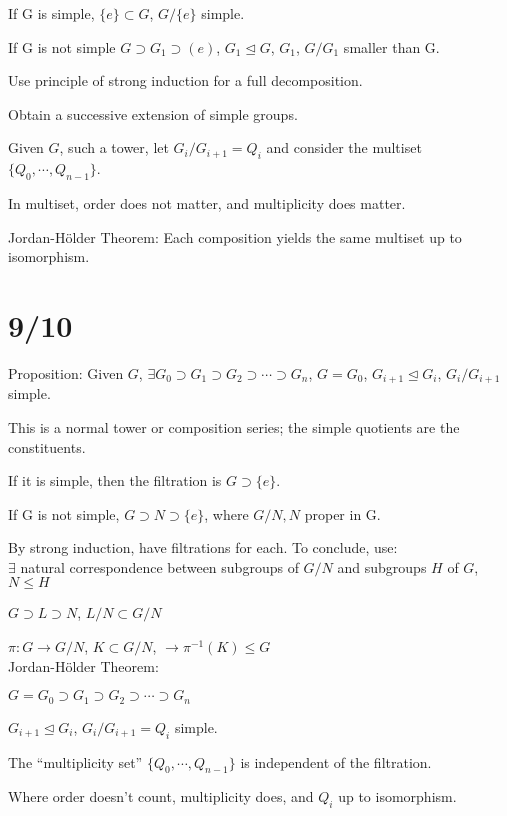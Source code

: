 \documentclass[12pt]{article}
\begin{document}
If G is simple, $\{e\} \subset G$, $G/\{e\}$ simple.

If G is not simple $G \supset G_1 \supset (e)$, $G_1 \trianglelefteq G$, $G_1$, $G/G_1$ smaller than G.

Use principle of strong induction for a full decomposition.

Obtain a successive extension of simple groups.

\noindent
Given $G$, such a tower, let $G_i/G_{i+1} = Q_i$ and consider the multiset $\{Q_0,\cdots , Q_{n-1}\}$.

In multiset, order does not matter, and multiplicity does matter.

\noindent
Jordan-H\"{o}lder Theorem: Each composition yields the same multiset up to isomorphism.

\section{9/10}

\noindent
Proposition: Given $G$, $\exists G_0 \supset G_1 \supset G_2 \supset \cdots \supset G_n$, $G = G_0$, $G_{i + 1} \trianglelefteq G_i$, $G_i/G_{i+1}$ simple.

This is a normal tower or composition series; the simple quotients are the constituents.

If it is simple, then the filtration is $G \supset \{e\}$.

If G is not simple, $G \supset N \supset \{e\}$, where $G/N, N$ proper in G.

By strong induction, have filtrations for each.  To conclude, use:\\

$\exists$ natural correspondence between subgroups of $G/N$ and subgroups $H$ of $G$, $N \leq H$

$G \supset L \supset N$, $L/N \subset G/N$

$\pi: G \to G/N$,  $K \subset G/N$, $\to \pi^{-1}(K) \leq G$\\

\noindent
Jordan-H\"{o}lder Theorem:

$G = G_0 \supset G_1 \supset G_2 \supset \cdots \supset G_n$

$G_{i + 1} \trianglelefteq G_i$, $G_i/G_{i + 1} = Q_i$ simple.

The ``multiplicity set'' $\{Q_0, \cdots, Q_{n - 1}\}$ is independent of the filtration.

Where order doesn't count, multiplicity does, and $Q_i$ up to isomorphism.\\
\end{document}
